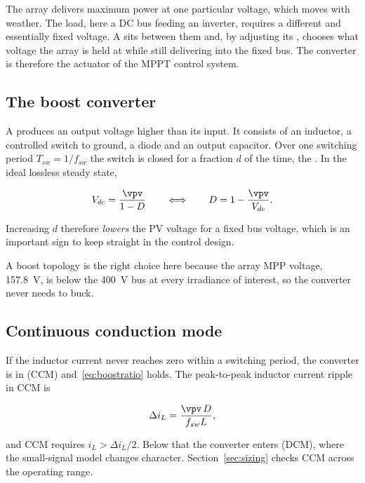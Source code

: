 The array delivers maximum power at one particular voltage, which moves with
weather. The load, here a DC bus feeding an inverter, requires a different and
essentially fixed voltage. A  sits between them and, by
adjusting its , chooses what voltage the array is held at while
still delivering into the fixed bus. The converter is therefore the actuator of
the MPPT control system.

\subsection{The boost converter}

A  produces an output voltage higher than its input. It
consists of an inductor, a controlled switch to ground, a diode and an output
capacitor. Over one switching period $T_{sw} = 1/f_{sw}$ the switch is closed
for a fraction $d$ of the time, the . In the ideal lossless
steady state,

\begin{equation}
V_{dc} = \frac{\vpv}{1 - D} \qquad\Longleftrightarrow\qquad D = 1 - \frac{\vpv}{V_{dc}} .
\label{eq:boostratio}
\end{equation}

Increasing $d$ therefore \emph{lowers} the PV voltage for a fixed bus voltage,
which is an important sign to keep straight in the control design.

A boost topology is the right choice here because the array MPP voltage,
\SI{157.8}{\volt}, is below the \SI{400}{\volt} bus at every irradiance of
interest, so the converter never needs to buck.

\subsection{Continuous conduction mode}

If the inductor current never reaches zero within a switching period, the
converter is in  (CCM) and~\eqref{eq:boostratio}
holds. The peak-to-peak inductor current ripple in CCM is

\begin{equation}
\Delta i_L = \frac{\vpv\, D}{f_{sw} L},
\label{eq:iripple}
\end{equation}

and CCM requires $i_L > \Delta i_L / 2$. Below that the converter enters
 (DCM), where the small-signal model changes
character. Section~\ref{sec:sizing} checks CCM across the operating range.

